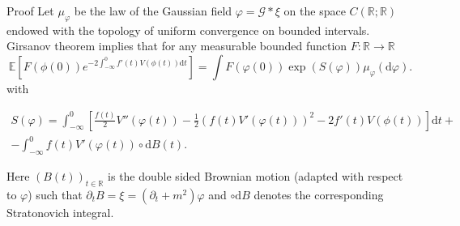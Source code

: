 \documentclass[a4paper,10pt]{article}
\newcommand{\mathd}{\mathrm{d}}
\newenvironment{proof*}[1]{\noindent\textbf{#1\ }}{\hspace*{\fill}$\Box$\medskip}
\begin{document}
\begin{proof*}{Proof}
  Let $\mu_{\varphi}$ be the law of the Gaussian field $\varphi = \mathcal{G}
  \ast \xi$ on the space $C (\mathbb{R}; \mathbb{R})$ endowed with the
  topology of uniform convergence on bounded intervals. Girsanov theorem
  implies that for any measurable bounded function $F : \mathbb{R} \rightarrow
  \mathbb{R}$
  \begin{equation}
    \mathbb{E} \left[ F (\phi (0)) e^{- 2 \int_{- \infty}^0 f' (t) V (\phi
    (t)) \mathd t} \right] = \int F (\varphi (0)) \exp (S (\varphi))
    \mu_{\varphi} (\mathd \varphi) . \label{eq:integral}
  \end{equation}
  with
  
\begin{multline*} S (\varphi) = \int_{- \infty}^0 \left[ \frac{f (t)}{2} V''
     (\varphi (t)) - \frac{1}{2} (f (t) V' (\varphi (t)))^2 - 2 f' (t) V (\phi
     (t)) \right] \mathd t+\\
 - \int_{- \infty}^0 f (t) V' (\varphi (t)) \circ
     \mathd B (t) .\end{multline*}%
  
  Here $(B (t))_{t \in \mathbb{R}}$ is the double sided Brownian motion
  (adapted with respect to $\varphi$) such that $\partial_t B = \xi =
  (\partial_t + m^2) \varphi$ and $\circ \mathd B$ denotes the corresponding
  Stratonovich integral.
  

\end{proof*}
\end{document}
